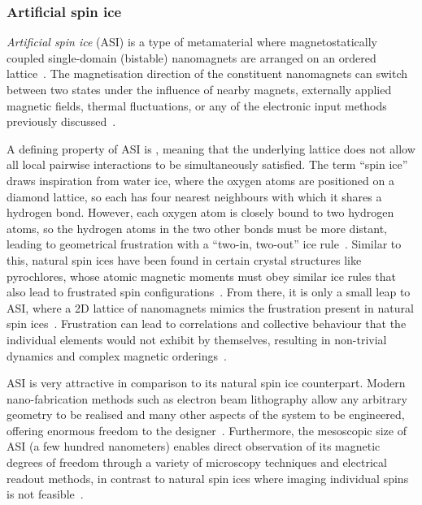 \subsubsection{Artificial spin ice}\label{sec:1:ASI}
\textit{Artificial spin ice} (ASI) is a type of metamaterial where magnetostatically coupled single-domain (bistable) nanomagnets are arranged on an ordered lattice~\cite{RC_ASI,flatspin}.
The magnetisation direction of the constituent nanomagnets can switch between two states under the influence of nearby magnets, externally applied magnetic fields, thermal fluctuations, or any of the electronic input methods previously discussed~\cite{CoerciveFieldReversal,BrownThermalFluctuations,SOT_FM_AFM,brataas2012current}. \par
A defining property of ASI is , meaning that the underlying lattice does not allow all local pairwise interactions to be simultaneously satisfied.
The term ``spin ice'' draws inspiration from water ice, where the oxygen atoms are positioned on a diamond lattice, so each has four nearest neighbours with which it shares a hydrogen bond. %
However, each oxygen atom is closely bound to two hydrogen atoms, so the hydrogen atoms in the two other bonds must be more distant, leading to geometrical frustration with a ``two-in, two-out'' ice rule~\cite{nisoli2013colloquium,ZeroPointEntropy,heyderman2013artificial,MagnetizationDynamicsASI}.
Similar to this, natural spin ices have been found in certain crystal structures like pyrochlores, whose atomic magnetic moments must obey similar ice rules that also lead to frustrated spin configurations~\cite{nisoli2013colloquium}.
From there, it is only a small leap to ASI, where a 2D lattice of nanomagnets mimics the frustration present in natural spin ices~\cite{heyderman2013artificial}.
Frustration can lead to correlations and collective behaviour that the individual elements would not exhibit by themselves, resulting in non-trivial dynamics and complex magnetic orderings~\cite{AdvancesASI,ASI_computation,ApparentFMpinwheel}. \par
ASI is very attractive in comparison to its natural spin ice counterpart.
Modern nano-fabrication methods such as electron beam lithography allow any arbitrary geometry to be realised and many other aspects of the system to be engineered, offering enormous freedom to the designer~\cite{AdvancesASI,ASI_computation}.
Furthermore, the mesoscopic size of ASI (a few hundred nanometers) enables direct observation of its magnetic degrees of freedom through a variety of microscopy techniques and electrical readout methods, in contrast to natural spin ices where imaging individual spins is not feasible~\cite{nisoli2013colloquium,freeman2001advances}.
